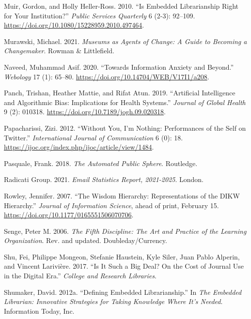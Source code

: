 \documentclass[
  letterpaper,
  DIV=11,
  numbers=noendperiod]{scrreprt}
\newlength{\cslhangindent}
\newenvironment{CSLReferences}[2] %
 {\begin{list}{}{%
  \setlength{\itemindent}{0pt}
  \setlength{\leftmargin}{0pt}
  \setlength{\parsep}{0pt}
  \ifodd #1
   \setlength{\leftmargin}{\cslhangindent}
   \setlength{\itemindent}{-1\cslhangindent}
  \fi
  \setlength{\itemsep}{#2\baselineskip}}}
 {\end{list}}
\begin{document}
\begin{CSLReferences}{1}{1}
Muir, Gordon, and Holly Heller-Ross. 2010. {``Is Embedded Librarianship
Right for Your Institution?''} \emph{Public Services Quarterly} 6 (2-3):
92--109. \url{https://doi.org/10.1080/15228959.2010.497464}.

Murawski, Michael. 2021. \emph{Museums as Agents of Change: A Guide to
Becoming a Changemaker}. Rowman \& Littlefield.

Naveed, Muhammad Asif. 2020. {``Towards {Information} {Anxiety} and
{Beyond}.''} \emph{Webology} 17 (1): 65--80.
\url{https://doi.org/10.14704/WEB/V17I1/a208}.

Panch, Trishan, Heather Mattie, and Rifat Atun. 2019. {``Artificial
Intelligence and Algorithmic Bias: Implications for Health Systems.''}
\emph{Journal of Global Health} 9 (2): 010318.
\url{https://doi.org/10.7189/jogh.09.020318}.

Papacharissi, Zizi. 2012. {``Without {You}, {I}'m {Nothing}:
{Performances} of the {Self} on {Twitter}.''} \emph{International
Journal of Communication} 6 (0): 18.
\url{https://ijoc.org/index.php/ijoc/article/view/1484}.

Pasquale, Frank. 2018. \emph{The Automated Public Sphere}. Routledge.

Radicati Group. 2021. \emph{Email Statistics Report, 2021-2025}. London.

Rowley, Jennifer. 2007. {``The Wisdom Hierarchy: Representations of the
DIKW Hierarchy.''} \emph{Journal of Information Science}, ahead of
print, February 15. \url{https://doi.org/10.1177/0165551506070706}.

Senge, Peter M. 2006. \emph{The Fifth Discipline: The Art and Practice
of the Learning Organization}. Rev. and updated. Doubleday/Currency.

Shu, Fei, Philippe Mongeon, Stefanie Haustein, Kyle Siler, Juan Pablo
Alperin, and Vincent Larivière. 2017. {``Is It Such a Big Deal? On the
Cost of Journal Use in the Digital Era.''} \emph{College and Research
Libraries}.

Shumaker, David. 2012a. {``Defining Embedded Librarianship.''} In
\emph{The {Embedded} {Librarian}: Innovative Strategies for Taking
Knowledge Where It's Needed}. Information Today, Inc.


\end{CSLReferences}
\end{document}
